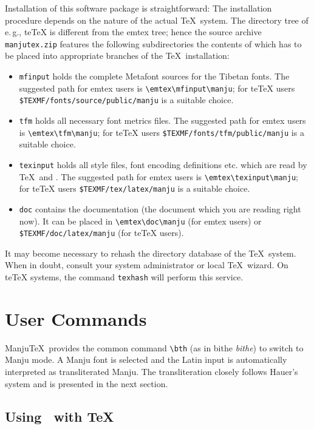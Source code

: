 \documentclass[a4paper,11pt]{article}
\begin{document}
Installation of this software package is straightforward:
The installation procedure depends on the nature of the actual
\TeX\ system. The directory tree of e.\,g., teTeX is different
from the emtex tree; hence the source archive \texttt{manjutex.zip}
features the following subdirectories the contents of which has to be
placed into appropriate branches of the \TeX\ installation:
\begin{itemize}
	\item \texttt{mfinput} holds the complete Metafont sources 
		for the Tibetan fonts. The suggested path for emtex
		users is \verb"\emtex\mfinput\manju"; for teTeX users
		\verb"$TEXMF/fonts/source/public/manju" is a suitable
		choice.
	\item \texttt{tfm} holds all necessary font metrics files.
	The suggested path for emtex users is \verb"\emtex\tfm\manju";
	for teTeX users \verb"$TEXMF/fonts/tfm/public/manju"
	is a suitable choice.
	\item \texttt{texinput} holds all style files, font encoding
		definitions etc. which are read by \TeX\ and \LaTeXe.
		The suggested path for emtex users is
		\verb"\emtex\texinput\manju"; for teTeX users
		\verb"$TEXMF/tex/latex/manju" is a suitable choice.
	\item \texttt{doc} contains the documentation (the document
		which you are reading right now). It can be placed
		in \verb"\emtex\doc\manju" (for emtex users) or 
		\verb"$TEXMF/doc/latex/manju" (for teTeX users).
\end{itemize}

It may become necessary to rehash the directory database of the
\TeX\ system. When in doubt, consult your system administrator or
local \TeX\ wizard.
On teTeX systems, the command \texttt{texhash} will perform this service.


\section{User Commands\label{UserCommands}}

Manju\TeX\ provides the common command
\verb|\bth| (as in {\bth bithe} \textit{bithe}) to switch to
Manju mode. A Manju font is selected and the Latin input is
automatically interpreted as transliterated Manju. The
transliteration closely follows Hauer's system and is presented in
the next section.

\subsection{Using \ManjuTeX\ with \TeX}
\end{document}

